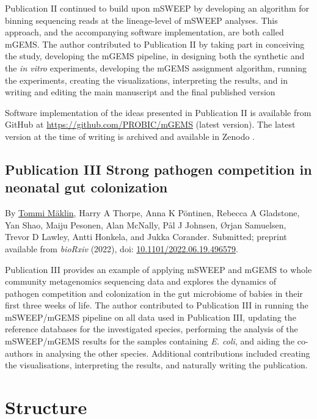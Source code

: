 \documentclass[officiallayout]{tktla}
\begin{document}
Publication II \citep{maklin_bacterial_2021} continued to build upon
mSWEEP by developing an algorithm for binning sequencing reads at the
lineage-level of mSWEEP analyses. This approach, and the accompanying software
implementation, are both called mGEMS. The author contributed to Publication II by
taking part in conceiving the study, developing the mGEMS pipeline, in
designing both the synthetic and the \textit{in vitro} experiments,
developing the mGEMS assignment algorithm, running the experiments,
creating the visualizations, interpreting the results, and in writing
and editing the main manuscript and the final published version

Software implementation of the ideas presented in Publication II is
available from GitHub at
\href{https://github.com/PROBIC/mGEMS}{https://github.com/PROBIC/mGEMS} (latest version).
The latest version at the time of writing is archived and available in
Zenodo \citep{maklin_mGEMS}.

\vfill
\pagebreak

\subsection*{Publication III \textemdash{ } Strong pathogen competition in neonatal gut colonization}
By \underline{Tommi M\"aklin}, Harry A Thorpe, Anna K P\"ontinen, Rebecca
A Gladstone, Yan Shao, Maiju Pesonen, Alan McNally, P\aa l J Johnsen,
\O rjan Samuelsen, Trevor D Lawley, Antti Honkela, and Jukka
Corander. Submitted; preprint available from \textit{bioRxiv} (2022),
doi: \href{https://doi.org/10.1101/2022.06.19.496579}{10.1101/2022.06.19.496579}.

Publication III \citep{maklin_strong_2022} provides an example of
applying mSWEEP and mGEMS to whole community metagenomics
sequencing data and explores the dynamics of pathogen competition and
colonization in the gut microbiome of babies in their first three
weeks of life. The author contributed to Publication III in running the
mSWEEP/mGEMS pipeline on all data used in Publication III, updating the
reference databases for the investigated species, performing the
analysis of the mSWEEP/mGEMS results for the samples containing
\textit{E. coli}, and aiding the co-authors in analysing the other
species. Additional contributions included creating the visualisations,
interpreting the results, and naturally writing the publication.

\section{Structure}
\end{document}
